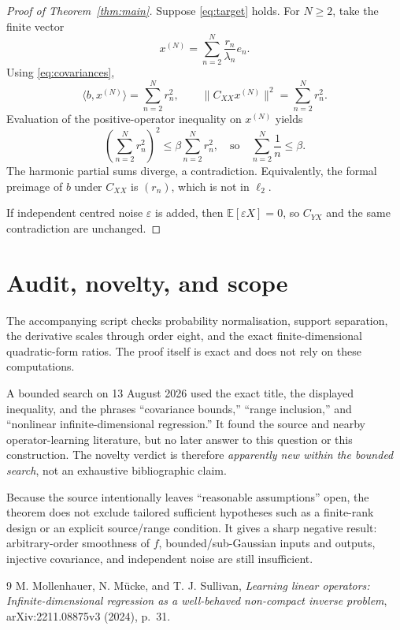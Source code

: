 \documentclass[10pt]{article}
\newcommand{\E}{\mathbb E}
\begin{document}
\begin{proof}[Proof of Theorem~\ref{thm:main}]
Suppose \eqref{eq:target} holds. For $N\geq2$, take the finite vector
\[
 x^{(N)}=\sum_{n=2}^N\frac{r_n}{\lambda_n}e_n.
\]
Using \eqref{eq:covariances},
\[
 \langle b,x^{(N)}\rangle=\sum_{n=2}^N r_n^2,
 \qquad
 \|C_{XX}x^{(N)}\|^2=\sum_{n=2}^N r_n^2.
\]
Evaluation of the positive-operator inequality on $x^{(N)}$ yields
\[
 \left(\sum_{n=2}^N r_n^2\right)^2
 \leq\beta\sum_{n=2}^N r_n^2,
 \quad\text{so}\quad
 \sum_{n=2}^N\frac1n\leq\beta.
\]
The harmonic partial sums diverge, a contradiction. Equivalently, the formal
preimage of $b$ under $C_{XX}$ is $(r_n)$, which is not in $\ell_2$.

If independent centred noise $\varepsilon$ is added, then
$\E[\varepsilon X]=0$, so $C_{YX}$ and the same contradiction are unchanged.
\end{proof}

\section{Audit, novelty, and scope}

The accompanying script checks probability normalisation, support separation,
the derivative scales through order eight, and the exact finite-dimensional
quadratic-form ratios. The proof itself is exact and does not rely on these
computations.

A bounded search on 13 August 2026 used the exact title, the displayed
inequality, and the phrases ``covariance bounds,'' ``range inclusion,'' and
``nonlinear infinite-dimensional regression.'' It found the source and nearby
operator-learning literature, but no later answer to this question or this
construction. The novelty verdict is therefore \emph{apparently new within
the bounded search}, not an exhaustive bibliographic claim.

Because the source intentionally leaves ``reasonable assumptions'' open,
the theorem does not exclude tailored sufficient hypotheses such as a
finite-rank design or an explicit source/range condition. It gives a sharp
negative result: arbitrary-order smoothness of $f$, bounded/sub-Gaussian
inputs and outputs, injective covariance, and independent noise are still
insufficient.

\begin{thebibliography}{9}
M. Mollenhauer, N. M\"ucke, and T. J. Sullivan,
\emph{Learning linear operators: Infinite-dimensional regression as a
well-behaved non-compact inverse problem}, arXiv:2211.08875v3 (2024),
p.~31.
\end{thebibliography}
\end{document}
